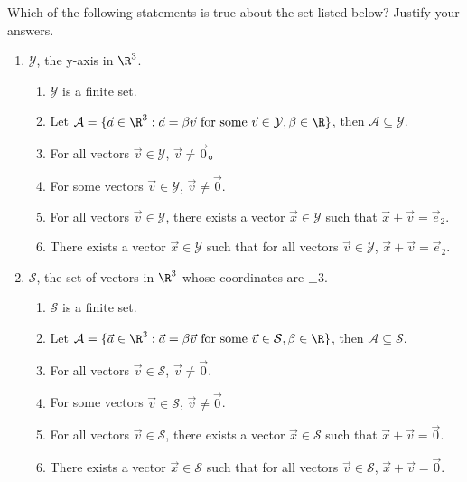 \begin{exercises}
\begin{problist}
		\prob 
		Which of the following statements is true about the set listed below? Justify your answers.
		    \begin{enumerate}
		        \item $\mathcal Y$, the y-axis in $\R^3$.
		        \begin{enumerate}
		            \item $\mathcal Y$ is a finite set.
		            \item Let $\mathcal A = \{\vec a \in \R^3 : \vec a = \beta \vec v \text{ for some } \vec v \in \mathcal Y, \beta \in \R \}$, then $\mathcal A \subseteq \mathcal{Y}$.
		            \item For all vectors $\vec v \in \mathcal Y$, $\vec v \neq \vec 0$。
		            \item For some vectors $\vec v \in \mathcal Y$, $\vec v \neq \vec 0$.
		            \item For all vectors $\vec v \in \mathcal Y$, there exists a vector $\vec x \in \mathcal Y$ such that $\vec x + \vec v = \vec e_2$.
		            \item There exists a vector $\vec x \in \mathcal Y$ such that for all vectors $\vec v \in \mathcal Y$, $\vec x + \vec v = \vec e_2$.
		        \end{enumerate}
		        \item $\mathcal S$, the set of vectors in $\R^3$ whose coordinates are $\pm 3$.
		        \begin{enumerate}
		            \item $\mathcal S$ is a finite set.
		            \item Let $\mathcal A = \{\vec a \in \R^3 : \vec a = \beta \vec v \text{ for some } \vec v \in \mathcal S, \beta \in \R \}$, then $\mathcal A \subseteq \mathcal S$.
		            \item For all vectors $\vec v \in \mathcal S$, $\vec v \neq \vec 0$.
		            \item For some vectors $\vec v \in \mathcal S$, $\vec v \neq \vec 0$.
		            \item For all vectors $\vec v \in \mathcal S$, there exists a vector $\vec x \in \mathcal S$ such that $\vec x + \vec v = \vec 0$.
		            \item There exists a vector $\vec x \in \mathcal S$ such that for all vectors $\vec v \in \mathcal S$, $\vec x + \vec v = \vec 0$.
		        \end{enumerate}
		    \end{enumerate}
		    

\end{problist}
\end{exercises}
